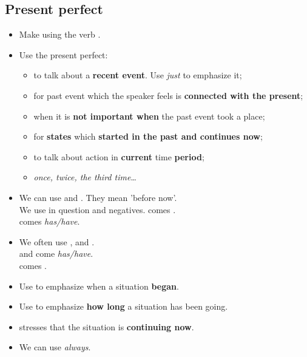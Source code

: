 \subsection{Present perfect}
\begin{itemize}
    \item Make using the verb .
    \item Use the present perfect:
    \begin{itemize}
        \item to talk about a \textbf{recent event}. Use \textit{just} to emphasize it;
        \item for past event which the speaker feels is \textbf{connected with the present};
        \item when it is \textbf{not important when} the past event took a place;
        \item for \textbf{states} which \textbf{started in the past and continues now};
        \item[\daash] to talk about action in \textbf{current} time \textbf{period};
        \item[\daash]  \textit{once, twice, the third time}\ldots{}
    \end{itemize}
    \item We can use  and . They mean 'before now'.\\
    We use  in question and negatives.  comes .\\
     comes  \textit{has/have}.
    \item We often use ,  and .\\
     and  come  \textit{has/have}.\\
     comes .
    \item Use  to emphasize when a situation \textbf{began}.
    \item Use  to emphasize \textbf{how long} a situation has been going.
    \item {} stresses that the situation is \textbf{continuing now}.
    \item[\ast] We can use \textit{always}.
\end{itemize}

